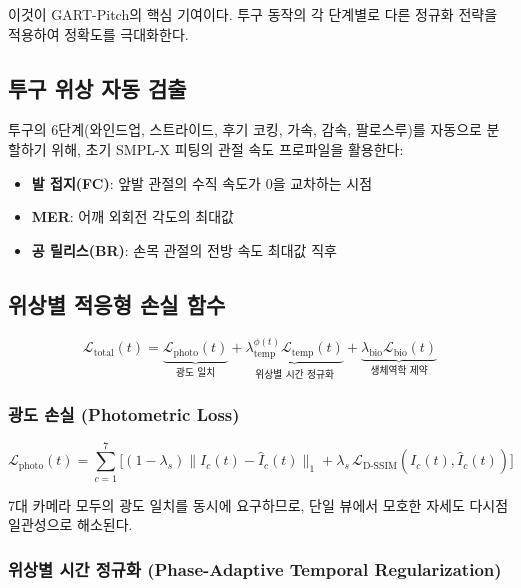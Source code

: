 \documentclass[11pt, a4paper]{report}
\begin{document}
이것이 GART-Pitch의 핵심 기여이다.
투구 동작의 각 단계별로 다른 정규화 전략을 적용하여 정확도를 극대화한다.

\subsection{투구 위상 자동 검출}

투구의 6단계(와인드업, 스트라이드, 후기 코킹, 가속, 감속, 팔로스루)를
자동으로 분할하기 위해, 초기 SMPL-X 피팅의 관절 속도 프로파일을 활용한다:

\begin{itemize}[nosep]
  \item \textbf{발 접지(FC)}: 앞발 관절의 수직 속도가 0을 교차하는 시점
  \item \textbf{MER}: 어깨 외회전 각도의 최대값
  \item \textbf{공 릴리스(BR)}: 손목 관절의 전방 속도 최대값 직후
\end{itemize}

\subsection{위상별 적응형 손실 함수}

\begin{equation}
\mathcal{L}_{\text{total}}(t) =
  \underbrace{\mathcal{L}_{\text{photo}}(t)}_{\text{광도 일치}}
  + \underbrace{\lambda_{\text{temp}}^{\phi(t)} \mathcal{L}_{\text{temp}}(t)}_{\text{위상별 시간 정규화}}
  + \underbrace{\lambda_{\text{bio}} \mathcal{L}_{\text{bio}}(t)}_{\text{생체역학 제약}}
\label{eq:total_loss}
\end{equation}

\subsubsection{광도 손실 (Photometric Loss)}

\begin{equation}
\mathcal{L}_{\text{photo}}(t) = \sum_{c=1}^{7}
  \Big[ (1-\lambda_s)\|I_c(t) - \hat{I}_c(t)\|_1 + \lambda_s\, \mathcal{L}_{\text{D-SSIM}}(I_c(t), \hat{I}_c(t)) \Big]
\end{equation}

7대 카메라 모두의 광도 일치를 동시에 요구하므로,
단일 뷰에서 모호한 자세도 다시점 일관성으로 해소된다.

\subsubsection{위상별 시간 정규화 (Phase-Adaptive Temporal Regularization)}
\end{document}
